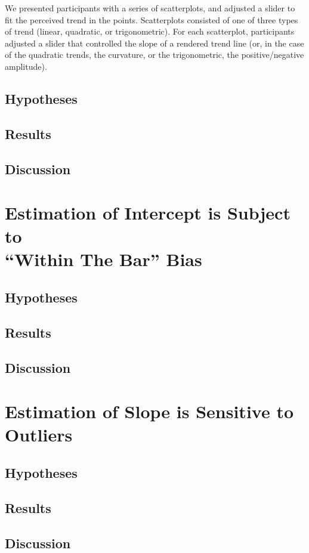 \documentclass{sigchi}
\begin{document}
We presented participants with a series of scatterplots, and adjusted a slider to fit the perceived trend in the points. Scatterplots consisted of one of three types of trend (linear, quadratic, or trigonometric). For each scatterplot, participants adjusted a slider that controlled the slope of a rendered trend line (or, in the case of the quadratic trends, the curvature, or the trigonometric, the positive/negative amplitude).


\subsection{Hypotheses}
\subsection{Results}
\subsection{Discussion}

\section{Estimation of Intercept is Subject to \\ ``Within The Bar'' Bias}
\subsection{Hypotheses}
\subsection{Results}
\subsection{Discussion}

\section{Estimation of Slope is Sensitive to Outliers}
\subsection{Hypotheses}
\subsection{Results}
\subsection{Discussion}
\end{document}
